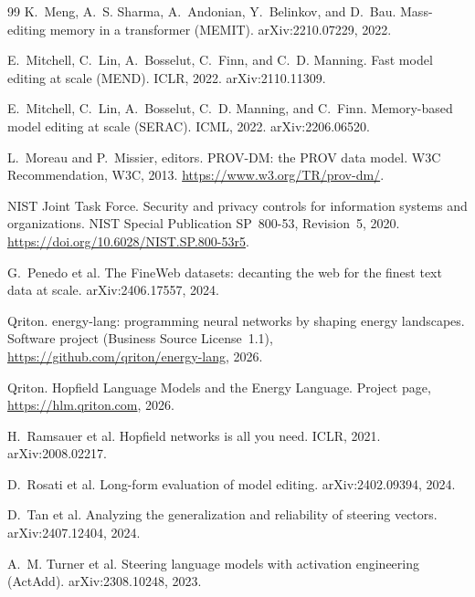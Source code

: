 \documentclass[11pt]{article}
\theoremstyle{remark}
\begin{document}
\begin{thebibliography}{99}
K.~Meng, A.~S. Sharma, A.~Andonian, Y.~Belinkov, and D.~Bau.
\newblock Mass-editing memory in a transformer (MEMIT).
\newblock arXiv:2210.07229, 2022.

E.~Mitchell, C.~Lin, A.~Bosselut, C.~Finn, and C.~D. Manning.
\newblock Fast model editing at scale (MEND).
\newblock ICLR, 2022. arXiv:2110.11309.

E.~Mitchell, C.~Lin, A.~Bosselut, C.~D. Manning, and C.~Finn.
\newblock Memory-based model editing at scale (SERAC).
\newblock ICML, 2022. arXiv:2206.06520.

L.~Moreau and P.~Missier, editors.
\newblock PROV-DM: the PROV data model.
\newblock W3C Recommendation, W3C, 2013. \url{https://www.w3.org/TR/prov-dm/}.

NIST Joint Task Force.
\newblock Security and privacy controls for information systems and organizations.
\newblock NIST Special Publication SP~800-53, Revision~5, 2020.
\url{https://doi.org/10.6028/NIST.SP.800-53r5}.

G.~Penedo et al.
\newblock The FineWeb datasets: decanting the web for the finest text data at scale.
\newblock arXiv:2406.17557, 2024.

Qriton.
\newblock energy-lang: programming neural networks by shaping energy landscapes.
\newblock Software project (Business Source License~1.1), \url{https://github.com/qriton/energy-lang}, 2026.

Qriton.
\newblock Hopfield Language Models and the Energy Language.
\newblock Project page, \url{https://hlm.qriton.com}, 2026.

H.~Ramsauer et al.
\newblock Hopfield networks is all you need.
\newblock ICLR, 2021. arXiv:2008.02217.

D.~Rosati et al.
\newblock Long-form evaluation of model editing.
\newblock arXiv:2402.09394, 2024.

D.~Tan et al.
\newblock Analyzing the generalization and reliability of steering vectors.
\newblock arXiv:2407.12404, 2024.

A.~M. Turner et al.
\newblock Steering language models with activation engineering (ActAdd).
\newblock arXiv:2308.10248, 2023.


\end{thebibliography}
\end{document}
